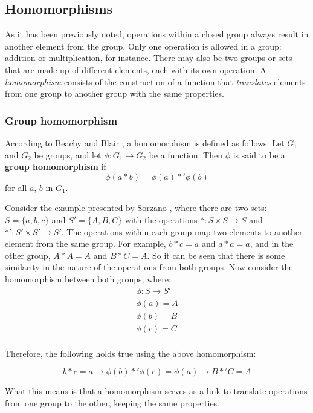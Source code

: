 \subsection{Homomorphisms}

As it has been previously noted, operations within a closed group always result in another element from the group. Only one operation is allowed in a group: addition or multiplication, for instance. There may also be two groups or sets that are made up of different elements, each with its own operation. A \emph{homomorphism} consists of the construction of a function that \emph{translates} elements from one group to another group with the same properties.

\subsubsection{Group homomorphism}

According to Beachy and Blair \cite{beachy2006abstract}, a homomorphism is defined as follows: Let $G_{1}$ and $G_{2}$ be groups, and let $\phi: G_{1} \rightarrow G_{2}$ be a function. Then $\phi$ is said to be a \textbf{group homomorphism} if
\[
\phi(a*b) = \phi(a) *' \phi(b)
\]
for all $a$, $b$ in $G_{1}$.

Consider the example presented by Sorzano \cite{sorzano2013}, where there are two sets: $S= \{a, b, c\}$ and $S' = \{A, B, C\}$  with the operations $*: S \times S \rightarrow S$ and $*' : S' \times S' \rightarrow S'$. The operations within each group map two elements to another element from the same group. For example, $b*c=a$ and $a*a=a$, and in the other group, $A*A = A$ and $B*C=A$. So it can be seen that there is some similarity in the nature of the operations from both groups. Now consider the homomorphism between both groups, where:
\[
\begin{split}
  \phi: S \rightarrow S' \\
  \phi(a) = A \\
  \phi(b) = B \\
  \phi(c) = C \\
\end{split}
\]

\noindent Therefore, the following holds true using the above homomorphism:

\[
b*c=a \rightarrow \phi(b) *' \phi(c) = \phi(a) \rightarrow B *' C = A
\]

What this means is that a homomorphism serves as a link to translate operations from one group to the other, keeping the same properties.

